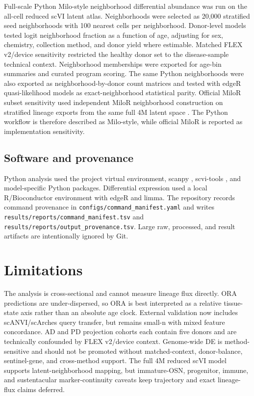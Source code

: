 \documentclass[11pt]{article}
\begin{document}
Full-scale Python Milo-style neighborhood differential abundance was run on the all-cell reduced scVI latent atlas. Neighborhoods were selected as 20,000 stratified seed neighborhoods with 100 nearest cells per neighborhood. Donor-level models tested logit neighborhood fraction as a function of age, adjusting for sex, chemistry, collection method, and donor yield where estimable. Matched FLEX v2/device sensitivity restricted the healthy donor set to the disease-sample technical context. Neighborhood memberships were exported for age-bin summaries and curated program scoring. The same Python neighborhoods were also exported as neighborhood-by-donor count matrices and tested with edgeR quasi-likelihood models as exact-neighborhood statistical parity. Official MiloR subset sensitivity used independent MiloR neighborhood construction on stratified lineage exports from the same full 4M latent space \citep{milo2022}. The Python workflow is therefore described as Milo-style, while official MiloR is reported as implementation sensitivity.

\subsection{Software and provenance}

Python analysis used the project virtual environment, scanpy \citep{scanpy2018}, scvi-tools \citep{scvitools2022}, and model-specific Python packages. Differential expression used a local R/Bioconductor environment with edgeR and limma. The repository records command provenance in \texttt{configs/command\_manifest.yaml} and writes \texttt{results/reports/command\_manifest.tsv} and \texttt{results/reports/output\_provenance.tsv}. Large raw, processed, and result artifacts are intentionally ignored by Git.

\section{Limitations}

The analysis is cross-sectional and cannot measure lineage flux directly. ORA predictions are under-dispersed, so ORA is best interpreted as a relative tissue-state axis rather than an absolute age clock. External validation now includes scANVI/scArches query transfer, but remains small-n with mixed feature concordance. AD and PD projection cohorts each contain five donors and are technically confounded by FLEX v2/device context. Genome-wide DE is method-sensitive and should not be promoted without matched-context, donor-balance, sentinel-gene, and cross-method support. The full 4M reduced scVI model supports latent-neighborhood mapping, but immature-OSN, progenitor, immune, and sustentacular marker-continuity caveats keep trajectory and exact lineage-flux claims deferred.
\end{document}
